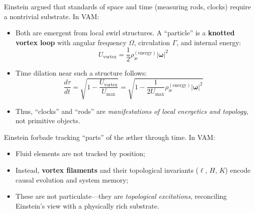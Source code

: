 \vspace{1em}

\begin{tcolorbox}[
    title={Clocks and Rods from Swirl Geometry},
    colback=gray!1!white,
    colframe=black,
    boxrule=0.6pt,
    sharp corners=southwest,
    fonttitle=\bfseries,
    breakable
]
Einstein argued that standards of space and time (measuring rods, clocks) require a nontrivial substrate. In VAM:
\begin{itemize}
    \item Both are emergent from local swirl structures. A “particle” is a \textbf{knotted vortex loop} with angular frequency \( \Omega \), circulation \( \Gamma \), and internal energy:
    \[
        U_{\text{vortex}} = \frac{1}{2} \rho_\text{\ae}^{(\text{energy})} |\boldsymbol{\omega}|^2
    \]
    \item Time dilation near such a structure follows:
    \[
        \frac{d\tau}{dt} = \sqrt{1 - \frac{U_{\text{vortex}}}{U_{\text{max}}}} = \sqrt{1 - \frac{1}{2U_{\text{max}}} \rho_\text{\ae}^{(\text{energy})} |\boldsymbol{\omega}|^2}
    \]
    \item Thus, “clocks” and “rods” are \emph{manifestations of local energetics and topology}, not primitive objects.
\end{itemize}
\end{tcolorbox}

\vspace{1em}

\begin{tcolorbox}[
    title={Reinterpreting “No Trackable Parts”},
    colback=gray!3!white,
    colframe=black,
    boxrule=0.6pt,
    sharp corners=southwest,
    fonttitle=\bfseries,
    breakable
]
Einstein forbade tracking “parts” of the æther through time. In VAM:
\begin{itemize}
    \item Fluid elements are not tracked by position;
    \item Instead, \textbf{vortex filaments} and their topological invariants (\( \ell \), \( H \), \( K \)) encode causal evolution and system memory;
    \item These are not particulate—they are \emph{topological excitations}, reconciling Einstein’s view with a physically rich substrate.
\end{itemize}
\end{tcolorbox}

\vspace{1em}

